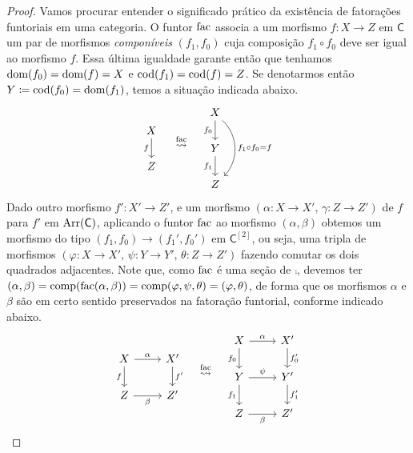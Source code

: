 \begin{proof}
  Vamos procurar entender o significado prático da existência de fatorações funtoriais em uma categoria.
  O funtor $\mathrm{fac}$ associa a um morfismo $f: X \to Z$ em $\mathsf{C}$ um par de morfismos \emph{componíveis} $(f_{1},f_{0})$ cuja composição $f_{1} \circ f_{0}$ deve ser igual ao morfismo $f$.
  Essa última igualdade garante então que tenhamos $\mathrm{dom}(f_{0}) = \mathrm{dom}(f) = X$ e $\mathrm{cod}(f_{1}) = \mathrm{cod}(f) = Z$.
  Se denotarmos então $Y \coloneqq \mathrm{cod}(f_{0}) = \mathrm{dom}(f_{1})$, temos a situação indicada abaixo.
  \begin{displaymath}
    \begin{tikzcd}
      X
      \arrow[d, "f" swap]
      \\ Z
    \end{tikzcd}
    \quad \overset{\fac}{\rightsquigarrow} \quad
    \begin{tikzcd}
      X
      \arrow[d, "f_{0}" swap]
      \arrow[dd, bend left=45, "f_{1} \circ f_{0} = f"]
      \\ Y
      \arrow[d, "f_{1}" swap]
      \\ Z
    \end{tikzcd}
  \end{displaymath}
  Dado outro morfismo $f': X' \to Z'$, e um morfismo $(\alpha: X \to X',\, \gamma: Z \to Z')$ de $f$ para $f'$ em $\mathrm{Arr}(\mathsf{C})$, aplicando o funtor $\mathrm{fac}$ ao morfismo $(\alpha,\beta)$ obtemos um morfismo do tipo $(f_{1},f_{0}) \to (f_{1}',f_{0}')$ em $\mathsf{C}^{[2]}$, ou seja, uma tripla de morfismos $(\varphi: X \to X',\, \psi: Y \to Y',\, \theta: Z \to Z')$ fazendo comutar os dois quadrados adjacentes.
  Note que, como $\mathrm{fac}$ é uma seção de $\comp$, devemos ter $(\alpha,\beta) = \mathrm{comp}(\mathrm{fac}(\alpha,\beta)) = \mathrm{comp}(\varphi,\psi,\theta) = (\varphi,\theta)$, de forma que os morfismos $\alpha$ e $\beta$ são em certo sentido preservados na fatoração funtorial, conforme indicado abaixo.
  \begin{displaymath}
    \begin{tikzcd}
      X
      \arrow[d, "f" swap]
      \arrow[r, "\alpha"]
      & X'
      \arrow[d, "f'"]
      \\ Z
      \arrow[r, "\beta" swap]
      & Z'
    \end{tikzcd}
    \quad \overset{\fac}{\rightsquigarrow} \quad
    \begin{tikzcd}
      X
      \arrow[r, "\alpha"]
      \arrow[d, "f_{0}" swap]
      & X'
      \arrow[d, "f_{0}'"]
      \\ Y
      \arrow[d, "f_{1}" swap]
      \arrow[r, "\psi"]
      & Y'
      \arrow[d, "f_{1}'"]
      \\ Z
      \arrow[r, "\beta" swap]
      & Z'
    \end{tikzcd}
  \end{displaymath}
  

\end{proof}
